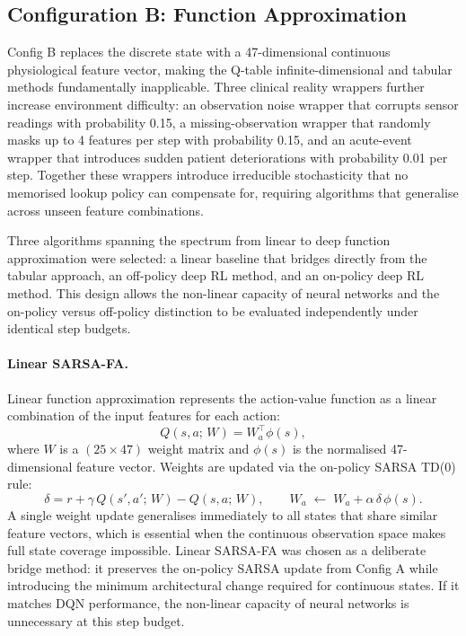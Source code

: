 \documentclass[11pt,a4paper]{article}
\begin{document}
\subsection{Configuration B: Function Approximation}
\label{sec:method_b}

Config B replaces the discrete state with a 47-dimensional continuous
physiological feature vector, making the Q-table infinite-dimensional and
tabular methods fundamentally inapplicable. Three clinical reality wrappers
further increase environment difficulty: an observation noise wrapper that
corrupts sensor readings with probability 0.15, a missing-observation wrapper
that randomly masks up to 4 features per step with probability 0.15, and an
acute-event wrapper that introduces sudden patient deteriorations with
probability 0.01 per step. Together these wrappers introduce irreducible
stochasticity that no memorised lookup policy can compensate for, requiring
algorithms that generalise across unseen feature combinations.

Three algorithms spanning the spectrum from linear to deep function
approximation were selected: a linear baseline that bridges directly from the
tabular approach, an off-policy deep RL method, and an on-policy deep RL
method. This design allows the non-linear capacity of neural networks and the
on-policy versus off-policy distinction to be evaluated independently under
identical step budgets.

\paragraph{Linear SARSA-FA.}
Linear function approximation represents the action-value function as a linear
combination of the input features for each action:
\begin{equation}
  Q(s, a;\, W) = W_a^\top \phi(s),
  \label{eq:lfa}
\end{equation}
where $W$ is a $(25 \times 47)$ weight matrix and $\phi(s)$ is the normalised
47-dimensional feature vector. Weights are updated via the on-policy SARSA
TD(0) rule:
\begin{equation}
  \delta = r + \gamma\, Q(s', a';\, W) - Q(s, a;\, W), \qquad
  W_a \;\leftarrow\; W_a + \alpha\,\delta\,\phi(s).
  \label{eq:lfa_update}
\end{equation}
A single weight update generalises immediately to all states that share similar
feature vectors, which is essential when the continuous observation space makes
full state coverage impossible. Linear SARSA-FA was chosen as a deliberate
bridge method: it preserves the on-policy SARSA update from Config A while
introducing the minimum architectural change required for continuous states.
If it matches DQN performance, the non-linear capacity of neural networks is
unnecessary at this step budget.
\end{document}
